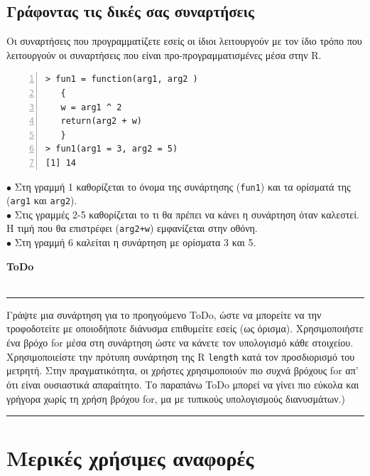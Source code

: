 \documentclass[a4paper,10pt,twocolumn]{article}
\makeatletter
\newenvironment{ToDo} {
  \begin{flushright}
    \hfill
    \begin{minipage}{0.9\columnwidth}
    \textsf{\textbf{ToDo}} \\
      \vspace{-0.7cm}\\
      {\color{Gray}\rule[-0.05cm]{\columnwidth}{1.5pt}}} {
      {\color{Gray}\rule[0.3cm]{\columnwidth}{1.5pt}}
    \end{minipage}
    \vspace{0.3cm}
  \end{flushright}
  }
\let\SF@@footnote\footnote
\def\footnote{\ifx\protect\@typeset@protect
 \expandafter\SF@@footnote
 \else
 \expandafter\SF@gobble@opt
 \fi
}
\edef\SF@gobble@opt{\noexpand\protect
 \expandafter\noexpand\csname SF@gobble@opt \endcsname}
\makeatother
\begin{document}
\subsection{Γράφοντας τις δικές σας συναρτήσεις}
\label{sec:progfunc}

Οι συναρτήσεις που προγραμματίζετε εσείς οι ίδιοι λειτουργούν με τον ίδιο τρόπο που λειτουργούν οι συναρτήσεις
που είναι προ-προγραμματισμένες μέσα στην R.

\begin{Verbatim}[frame=single,numbers=left,gobble=0, xleftmargin=0.35cm, numbersep=0.1cm]
> fun1 = function(arg1, arg2 )
   {
   w = arg1 ^ 2
   return(arg2 + w)
   }
> fun1(arg1 = 3, arg2 = 5) 
[1] 14

\end{Verbatim}

\noindent $\bullet$ Στη γραμμή 1 καθορίζεται το όνομα της συνάρτησης (\texttt{fun1}) και τα ορίσματά της
(\texttt{arg1} και \texttt{arg2}). \\
\noindent $\bullet$ Στις γραμμές 2-5 καθορίζεται το τι θα πρέπει να κάνει η συνάρτηση όταν καλεστεί. Η τιμή
που θα επιστρέφει (\texttt{arg2+w}) εμφανίζεται στην οθόνη. \\
\noindent $\bullet$ Στη γραμμή 6 καλείται η συνάρτηση με ορίσματα 3 και 5.

\begin{ToDo}
Γράψτε μια συνάρτηση για το προηγούμενο ToDo, ώστε να μπορείτε να την τροφοδοτείτε με οποιοδήποτε διάνυσμα 
επιθυμείτε εσείς (ως όρισμα). Χρησιμοποιήστε ένα βρόχο for μέσα στη συνάρτηση ώστε να κάνετε τον υπολογισμό
κάθε στοιχείου. Χρησιμοποιείστε την πρότυπη συνάρτηση της R \texttt{length} κατά τον προσδιορισμό του μετρητή.
\footnote{Στην πραγματικότητα, οι χρήστες χρησιμοποιούν πιο συχνά βρόχους for απ' ότι είναι ουσιαστικά
απαραίτητο. Το παραπάνω ToDo μπορεί να γίνει πιο εύκολα και γρήγορα χωρίς τη χρήση βρόχου for, μα με 
τυπικούς υπολογισμούς διανυσμάτων.})
\end{ToDo}


\section{Μερικές χρήσιμες αναφορές}
\end{document}
